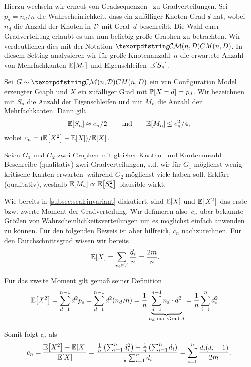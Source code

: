 Hierzu wechseln wir erneut von Gradsequenzen~\degseq{} zu Gradverteilungen.
Sei $p_d = n_d / n$ die Wahrscheinlichkeit, dass ein zufälliger Knoten Grad $d$ hat, wobei $n_d$ die Anzahl der Knoten in $\mathcal{D}$ mit Grad~$d$ beschreibt.
Die Wahl einer Gradverteilung erlaubt es uns nun beliebig große Graphen zu betrachten.
Wir verdeutlichen dies mit der Notation $\CMnd$.
In diesem Setting analysieren wir für große Knotenanzahl~$n$ die erwartete Anzahl von Mehrfachkanten $\mathbb{E}\!\left[M_n\right]$ und Eigenschleifen~$\mathbb{E}\!\left[S_n\right]$.

\begin{lemma}\label{lem:cm_anzahl_nicht_einfach}
    Sei $G \follows \CMnd$ ein von Configuration Model erzeugter Graph und $X$ ein zufälliger Grad mit $\mathbb{P}\!\left[X = d\right] = p_d$.
    Wir bezeichnen mit $S_n$ die Anzahl der Eigenschleifen und mit $M_n$ die Anzahl der Mehrfachkanten.
    Dann gilt
    \begin{align}
        \mathbb{E}\!\left[S_n\right] \approx c_n/2 \qquad \text{und} \qquad \mathbb{E}\!\left[M_n\right] \le c_n^2 / 4,
    \end{align}
    wobei $c_n = (\mathbb{E}\!\left[X^2\right] - \mathbb{E}\!\left[X\right]) / \mathbb{E}\!\left[X\right]$.
\end{lemma}

\begin{exercise}
    Seien $G_1$ und $G_2$ zwei Graphen mit gleicher Knoten- und Kantenanzahl.
    Beschreibe (qualitativ) zwei Gradverteilungen, s.d. wir für $G_1$ möglichst wenig kritische Kanten erwarten, während $G_2$ möglichst viele haben soll.
    Erkläre (qualitativ), weshalb $\mathbb{E}\!\left[M_n\right] \propto \mathbb{E}\!\left[S_n^2\right]$ plausible wirkt.
\end{exercise}

\begin{remark}
    Wie bereits in \cref{subsec:scaleinvariant} diskutiert, sind $\mathbb{E}\!\left[X\right]$ und $\mathbb{E}\!\left[X^2\right]$ das erste bzw. zweite Moment der Gradverteilung.
    Wir definieren also~$c_n$ über bekannte Größen von Wahrscheinlichkeitsverteilungen um es möglichst einfach anwenden zu können.
    Für den folgenden Beweis ist aber hilfreich, $c_n$ nachzurechnen.
    Für den Durchschnittsgrad wissen wir bereits
    \begin{align}
        \mathbb{E}\!\left[X\right] & = \sum_{v_i \in V} \frac{d_i}{n} = \frac {2m}{n}.
    \end{align}

    \noindent
    Für das zweite Moment gilt gemäß seiner Definition
    \begin{align}
        \mathbb{E}\!\left[X^2\right]
         & = \sum_{d=1}^{n-1} d^2 p_d
        = \sum_{d=1}^{n-1} d^2 (n_d / n)
        = \frac 1 n \underbrace{\sum_{d=1}^{n-1} n_d \cdot d^2}_\text{$n_d$ mal Grad $d$}
        = \frac 1 n \sum_{i=1}^n d_i^2.
    \end{align}

    \noindent
    Somit folgt $c_n$ als
    \begin{align}
        c_n
        = \frac{\mathbb{E}\!\left[X^2\right] - \mathbb{E}\!\left[X\right]}{\mathbb{E}\!\left[X\right]}
        = \frac{ \frac 1 n \left(\sum_{i=1}^n d_i^2\right) - \frac 1 n \left(\sum_{i=1}^n d_i\right)}{\frac 1 n \sum_{i=1}^n d_i}
        = \sum_{i=1}^n \frac{d_i (d_i - 1)}{2m}.
    \end{align}
\end{remark}

